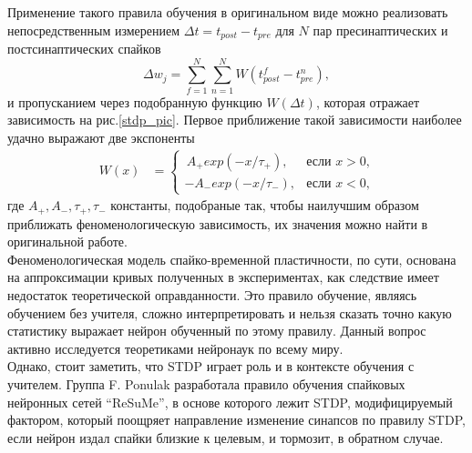 \documentclass[a4paper,10pt]{article}
\begin{document}
\indent Применение такого правила обучения в оригинальном виде можно реализовать непосредственным измерением $\Delta t = t_{post}-t_{pre}$ для $N$ пар пресинаптических и постсинаптических спайков
\begin{equation}\label{eq:sum_stdp}
\Delta w_{j} = \sum_{f=1}^N \sum_{n=1}^{N} W(t_{post}^{f} - t_{pre}^{n}),
\end{equation}
 и пропусканием через подобранную функцию $W(\Delta t)$, которая отражает зависимость на рис.\ref{stdp_pic}. Первое приближение такой зависимости наиболее удачно выражают две экспоненты
\begin{equation}
\begin{split}
W(x) &=\begin{cases} \, A_{+} exp(-x/\tau_{+}), & \mbox{если }x>0\mbox{,} \\ -A_{-} exp(-x/\tau_{-}), & \mbox{если }x<0\mbox{,} \end{cases}
\end{split}
\end{equation}
где $A_{+},A_{-},\tau_{+}, \tau_{-}$ константы, подобраные так, чтобы наилучшим образом приближать феноменологическую зависимость, их значения можно найти в оригинальной работе\cite{SongStdp}.\\
\indent Феноменологическая модель спайко-временной пластичности, по сути, основана на аппроксимации кривых полученных в экспериментах, как следствие имеет недостаток теоретической оправданности. Это правило обучение, являясь обучением без учителя, сложно интерпретировать и нельзя сказать точно какую статистику выражает нейрон обученный по этому правилу. Данный вопрос активно исследуется теоретиками нейронаук по всему миру.\\
\indent Однако, стоит заметить, что STDP играет роль и в контексте обучения с учителем. Группа F. Ponulak разработала правило обучения спайковых нейронных сетей ``ReSuMe''\cite{ponulak2010supervised}, в основе которого лежит STDP, модифицируемый фактором, который поощряет направление изменение синапсов по правилу STDP, если нейрон издал спайки близкие к целевым, и тормозит, в обратном случае.\\   
\end{document}
